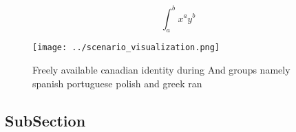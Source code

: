 \documentclass[a4paper]{article}
\begin{document}
\[ \int_{a}^{b}{x^{a}y^{b}} \]

\begin{figure}
\centering
\texttt{[image: ../scenario\_visualization.png]}
\caption{Freely available canadian identity during And groups namely spanish portuguese polish and greek ran
}
\end{figure}
 
\subsection{SubSection}
\end{document}
